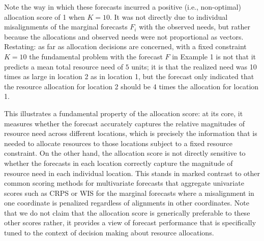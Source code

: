 \documentclass{article}
\begin{document}
Note the way in which these forecasts incurred a positive (i.e., non-optimal) allocation score of 1 when $K = 10$. It was not directly due to individual misalignments of the marginal forecasts $F_i$ with the observed needs, but rather because the allocations and observed needs were not proportional as vectors.
Restating: as far as allocation decisions are concerned, with a fixed constraint $K=10$ the fundamental problem with the forecast $F$ in Example 1 is not that it predicts a mean total resource need of $5$ units; it is that the realized need was 10 times as large in location 2 as in location 1, but the forecast only indicated that the resource allocation for location 2 should be 4 times the allocation for location 1.

This illustrates a fundamental property of the allocation score: at its core, it measures whether the forecast accurately captures the relative magnitudes of resource need across different locations, which is precisely the information that is needed to allocate resources to those locations subject to a fixed resource constraint.
On the other hand, the allocation score is not directly sensitive to whether the forecasts in each location correctly capture the magnitude of resource need in each individual location.
This stands in marked contrast to other common scoring methods for multivariate forecasts that aggregate univariate scores such as CRPS or WIS for the marginal forecasts where a 
misalignment in one coordinate is penalized regardless of alignments in other coordinates. Note that we do not claim that the allocation score is generically preferable to these other scores \textemdash rather, it provides a view of forecast performance that is specifically tuned to the context of decision making about resource allocations.


\end{document}
